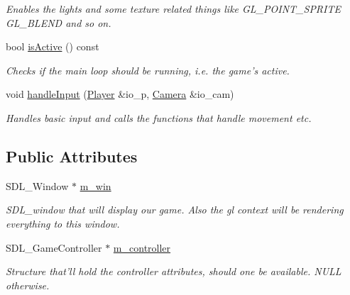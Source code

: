 \begin{DoxyCompactItemize}
\begin{DoxyCompactList}\small\item\em Enables the lights and some texture related things like GL\_\-POINT\_\-SPRITE GL\_\-BLEND and so on. \item\end{DoxyCompactList}\item 
bool \hyperlink{classSDL__GL_adee0be8bbc1db6c59ade77c047099927}{isActive} () const 
\begin{DoxyCompactList}\small\item\em Checks if the main loop should be running, i.e. the game's active. \item\end{DoxyCompactList}\item 
void \hyperlink{classSDL__GL_a9194ac801dcae2d282b79d7f055f9ec3}{handleInput} (\hyperlink{classPlayer}{Player} \&io\_\-p, \hyperlink{classCamera}{Camera} \&io\_\-cam)
\begin{DoxyCompactList}\small\item\em Handles basic input and calls the functions that handle movement etc. \item\end{DoxyCompactList}\end{DoxyCompactItemize}
\subsection*{Public Attributes}
\begin{DoxyCompactItemize}
\item 
\hypertarget{classSDL__GL_a1411b45fe46ad2f71d545378a799184c}{
SDL\_\-Window $\ast$ \hyperlink{classSDL__GL_a1411b45fe46ad2f71d545378a799184c}{m\_\-win}}
\label{classSDL__GL_a1411b45fe46ad2f71d545378a799184c}

\begin{DoxyCompactList}\small\item\em SDL\_\-window that will display our game. Also the gl context will be rendering everything to this window. \item\end{DoxyCompactList}\item 
\hypertarget{classSDL__GL_a1a9e39a266153aa13df9979526441b89}{
SDL\_\-GameController $\ast$ \hyperlink{classSDL__GL_a1a9e39a266153aa13df9979526441b89}{m\_\-controller}}
\label{classSDL__GL_a1a9e39a266153aa13df9979526441b89}

\begin{DoxyCompactList}\small\item\em Structure that'll hold the controller attributes, should one be available. NULL otherwise. \item\end{DoxyCompactList}\end{DoxyCompactItemize}
